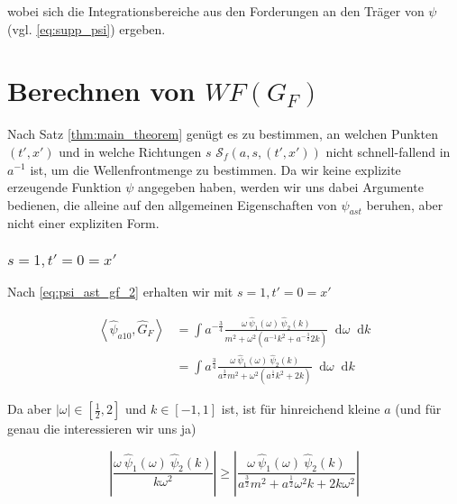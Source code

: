 \documentclass{scrartcl}
\renewcommand*\d{\mathop{}\!\mathrm{d}}
\begin{document}
wobei sich die Integrationsbereiche aus den Forderungen an den Träger von $\psi$
(vgl. \eqref{eq:supp_psi}) ergeben.


\section{Berechnen von $WF(G_F)$} %
\label{sec:berechnen_von_}

Nach Satz \eqref{thm:main_theorem} genügt es zu bestimmen, an welchen Punkten
$(t', x')$ und in welche Richtungen $s$ $\mathcal{S}_f(a,s,(t',x'))$ nicht schnell-fallend
in $a^{-1}$ ist, um die Wellenfrontmenge zu bestimmen. Da wir keine explizite
erzeugende Funktion $\psi$ angegeben haben, werden wir uns dabei Argumente bedienen,
die alleine auf den allgemeinen Eigenschaften von $\psi_{ast}$ beruhen, aber nicht
einer expliziten Form.

\subsubsection*{$s=1, t' = 0 = x'$}
Nach \eqref{eq:psi_ast_gf_2} erhalten wir mit $s=1, t' = 0 = x'$

\begin{align*}
    \left< \hat\psi_{a10}, \hat G_F \right>
    &=
    \int a^{-\frac{3}{4}} \frac{
        \omega ~\hat \psi_1(\omega) ~\hat \psi_2(k)
    }
    {
        m^2+\omega^2 (a^{-1}k^2 + a^{-\frac{3}{2}}2 k )
    }
    \d \omega \d k \\
    &=
    \int a^{\frac{3}{4}} \frac{
        \omega ~\hat \psi_1(\omega) ~\hat \psi_2(k)
    }
    {
        a^\frac{3}{2} m^2+\omega^2 (a^\frac{1}{2}k^2 + 2 k )
    }
    \d \omega \d k
\end{align*}

Da aber $|\omega| \in [\frac{1}{2},2]$ und $k \in [-1,1]$ ist, ist für hinreichend
kleine $a$ (und für genau die interessieren wir uns ja)

\begin{equation*}
    \left|
        \frac{\omega ~\hat \psi_1(\omega) ~\hat \psi_2(k)}{k \omega^2}
    \right|
    \geq
    \left|
        \frac{\omega ~\hat \psi_1(\omega) ~\hat \psi_2(k)}
        {a^\frac{3}{2}m^2+a^\frac{1}{2}\omega^2 k+2k \omega^2}
    \right|
\end{equation*}
\end{document}
